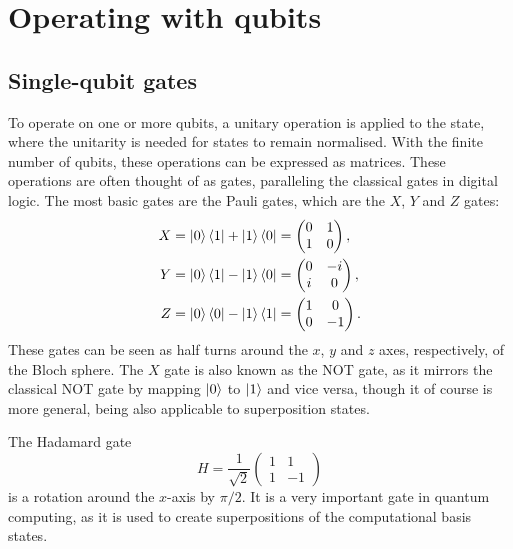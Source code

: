 \section{Operating with qubits}
\subsection{Single-qubit gates}
To operate on one or more qubits, a unitary operation is applied to the state, where the unitarity is needed for states to remain normalised.
With the finite number of qubits, these operations can be expressed as matrices.
These operations are often thought of as gates, paralleling the classical gates in digital logic.
The most basic gates are the Pauli gates, which are the $X$, $Y$ and $Z$ gates:
\begin{align}
    X =\ket{0}\bra{1} + \ket{1}\bra{0} & = \begin{pmatrix} 0 & 1 \\ 1 & 0 \end{pmatrix},  \\
    Y =\ket{0}\bra{1} - \ket{1}\bra{0} & = \begin{pmatrix} 0 & -i \\ i & 0 \end{pmatrix}, \\
    Z =\ket{0}\bra{0} - \ket{1}\bra{1} & = \begin{pmatrix} 1 & 0 \\ 0 & -1 \end{pmatrix}.
\end{align}
These gates can be seen as half turns around the $x$, $y$ and $z$ axes, respectively, of the Bloch sphere.
The $X$ gate is also known as the NOT gate, as it mirrors the classical NOT gate by mapping $\ket{0}$ to $\ket{1}$ and vice versa, though it of course is more general, being also applicable to superposition states.

The Hadamard gate
\begin{equation}
    H = \frac{1}{\sqrt{2}} \begin{pmatrix} 1 & 1 \\ 1 & -1 \end{pmatrix}
\end{equation}
is a rotation around the $x$-axis by $\pi/2$.
It is a very important gate in quantum computing, as it is used to create superpositions of the computational basis states.


